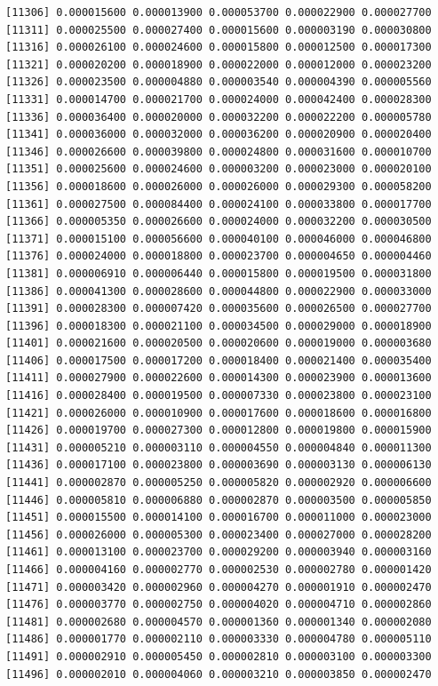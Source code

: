 \documentclass[]{article}
\begin{document}
\begin{verbatim}
[11306] 0.000015600 0.000013900 0.000053700 0.000022900 0.000027700
[11311] 0.000025500 0.000027400 0.000015600 0.000003190 0.000030800
[11316] 0.000026100 0.000024600 0.000015800 0.000012500 0.000017300
[11321] 0.000020200 0.000018900 0.000022000 0.000012000 0.000023200
[11326] 0.000023500 0.000004880 0.000003540 0.000004390 0.000005560
[11331] 0.000014700 0.000021700 0.000024000 0.000042400 0.000028300
[11336] 0.000036400 0.000020000 0.000032200 0.000022200 0.000005780
[11341] 0.000036000 0.000032000 0.000036200 0.000020900 0.000020400
[11346] 0.000026600 0.000039800 0.000024800 0.000031600 0.000010700
[11351] 0.000025600 0.000024600 0.000003200 0.000023000 0.000020100
[11356] 0.000018600 0.000026000 0.000026000 0.000029300 0.000058200
[11361] 0.000027500 0.000084400 0.000024100 0.000033800 0.000017700
[11366] 0.000005350 0.000026600 0.000024000 0.000032200 0.000030500
[11371] 0.000015100 0.000056600 0.000040100 0.000046000 0.000046800
[11376] 0.000024000 0.000018800 0.000023700 0.000004650 0.000004460
[11381] 0.000006910 0.000006440 0.000015800 0.000019500 0.000031800
[11386] 0.000041300 0.000028600 0.000044800 0.000022900 0.000033000
[11391] 0.000028300 0.000007420 0.000035600 0.000026500 0.000027700
[11396] 0.000018300 0.000021100 0.000034500 0.000029000 0.000018900
[11401] 0.000021600 0.000020500 0.000020600 0.000019000 0.000003680
[11406] 0.000017500 0.000017200 0.000018400 0.000021400 0.000035400
[11411] 0.000027900 0.000022600 0.000014300 0.000023900 0.000013600
[11416] 0.000028400 0.000019500 0.000007330 0.000023800 0.000023100
[11421] 0.000026000 0.000010900 0.000017600 0.000018600 0.000016800
[11426] 0.000019700 0.000027300 0.000012800 0.000019800 0.000015900
[11431] 0.000005210 0.000003110 0.000004550 0.000004840 0.000011300
[11436] 0.000017100 0.000023800 0.000003690 0.000003130 0.000006130
[11441] 0.000002870 0.000005250 0.000005820 0.000002920 0.000006600
[11446] 0.000005810 0.000006880 0.000002870 0.000003500 0.000005850
[11451] 0.000015500 0.000014100 0.000016700 0.000011000 0.000023000
[11456] 0.000026000 0.000005300 0.000023400 0.000027000 0.000028200
[11461] 0.000013100 0.000023700 0.000029200 0.000003940 0.000003160
[11466] 0.000004160 0.000002770 0.000002530 0.000002780 0.000001420
[11471] 0.000003420 0.000002960 0.000004270 0.000001910 0.000002470
[11476] 0.000003770 0.000002750 0.000004020 0.000004710 0.000002860
[11481] 0.000002680 0.000004570 0.000001360 0.000001340 0.000002080
[11486] 0.000001770 0.000002110 0.000003330 0.000004780 0.000005110
[11491] 0.000002910 0.000005450 0.000002810 0.000003100 0.000003300
[11496] 0.000002010 0.000004060 0.000003210 0.000003850 0.000002470

\end{verbatim}
\end{document}

